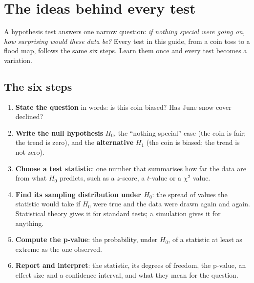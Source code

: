 \chapter{The ideas behind every test}\label{ch:ideas}

A hypothesis test answers one narrow question: \emph{if nothing special were going on, how surprising would these data be?} Every test in this guide, from a coin toss to a flood map, follows the same six steps. Learn them once and every test becomes a variation.

\section{The six steps}
\begin{enumerate}
\item \textbf{State the question} in words: is this coin biased? Has June snow cover declined?
\item \textbf{Write the null hypothesis} $H_0$, the ``nothing special'' case (the coin is fair; the trend is zero), and the \textbf{alternative} $H_1$ (the coin is biased; the trend is not zero).
\item \textbf{Choose a test statistic}: one number that summarises how far the data are from what $H_0$ predicts, such as a $z$-score, a $t$-value or a $\chi^2$ value.
\item \textbf{Find its sampling distribution under $H_0$}: the spread of values the statistic would take if $H_0$ were true and the data were drawn again and again. Statistical theory gives it for standard tests; a simulation gives it for anything.
\item \textbf{Compute the p-value}: the probability, under $H_0$, of a statistic at least as extreme as the one observed.
\item \textbf{Report and interpret}: the statistic, its degrees of freedom, the p-value, an effect size and a confidence interval, and what they mean for the question.
\end{enumerate}

